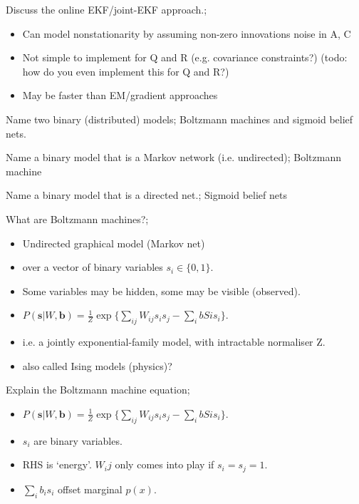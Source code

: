 \documentclass{article}
\begin{document}
Discuss the online EKF/joint-EKF approach.; \begin{itemize}
    \item Can model nonstationarity by assuming non-zero innovations noise in A, C
    \item Not simple to implement for Q and R (e.g. covariance constraints?) (todo: how do you even implement this for Q and R?)
    \item May be faster than EM/gradient approaches
\end{itemize}

Name two binary (distributed) models; Boltzmann machines and sigmoid belief nets.

Name a binary model that is a Markov network (i.e. undirected); Boltzmann machine

Name a binary model that is a directed net.; Sigmoid belief nets

What are Boltzmann machines?;\begin{itemize}
    \item Undirected graphical model (Markov net)
    \item over a vector of binary variables $s_i\in\{0, 1\}$.
    \item Some variables may be hidden, some may be visible (observed).
    \item $P(\mathbf{s}|W, \mathbf{b})=\frac{1}{Z}\exp\{\sum_{ij}W_{ij}s_is_j-\sum_ibSis_i\}$.
    \item i.e. a jointly exponential-family model, with intractable normaliser Z.
    \item also called Ising models (physics)?
\end{itemize} 

Explain the Boltzmann machine equation; \begin{itemize}
    \item $P(\mathbf{s}|W, \mathbf{b})=\frac{1}{Z}\exp\{\sum_{ij}W_{ij}s_is_j-\sum_ibSis_i\}$.
    \item $s_i$ are binary variables.
    \item RHS is `energy'. $W_ij$ only comes into play if $s_i=s_j=1$.
    \item $\sum_i b_is_i$ offset marginal $p(x)$.
\end{itemize}
\end{document}
